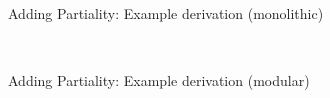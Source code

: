 \documentclass[main]{subfiles}
\begin{document}
\begin{frame}[fragile]{Adding Partiality: Example derivation (monolithic)}
\begin{code}
\\
%
\>[10]\AgdaSpace{}%
\AgdaSpace{}%
\AgdaSpace{}%
\AgdaSpace{}%
\AgdaSpace{}%
\AgdaSpace{}%
%
\>[27]\AgdaSpace{}%
\AgdaSpace{}%
\AgdaSpace{}%
\AgdaSpace{}%
\AgdaSpace{}%
\AgdaSpace{}%
\AgdaSpace{}%
%
\>[44]\<%
\end{code}
\end{frame}
\begin{frame}[fragile]{Adding Partiality: Example derivation (modular)}
\begin{code}%
\>[0]\AgdaFunction{\AgdaUnderscore{}}\AgdaSpace{}%
\AgdaSymbol{:}\AgdaSpace{}%
\AgdaSpace{}%
\AgdaSpace{}%
\AgdaSpace{}%
\AgdaSpace{}%
\AgdaSpace{}%
\AgdaSpace{}%
\AgdaSpace{}%
\AgdaSpace{}%
\AgdaSpace{}%
\AgdaSpace{}%
\AgdaSpace{}%
\AgdaSpace{}%
\AgdaSpace{}%
\AgdaSpace{}%
\AgdaSpace{}%
\AgdaSpace{}%
\AgdaSpace{}%
\AgdaSpace{}%
\AgdaSpace{}%
\AgdaSpace{}%
\AgdaSpace{}%
\AgdaSpace{}%
\AgdaSpace{}%
\AgdaSpace{}%
\AgdaSpace{}%
\AgdaSpace{}%
\AgdaSpace{}%
\AgdaSpace{}%
\AgdaSpace{}%
\AgdaSpace{}%
\AgdaSpace{}%
\AgdaSpace{}%
\AgdaSpace{}%
\AgdaSpace{}%
\<%
\\
\>[0]\AgdaSymbol{\AgdaUnderscore{}}%
\>[496I]\AgdaSymbol{=}\AgdaSpace{}%
%
\>[498I]\AgdaSpace{}%

\end{code}
\end{frame}
\end{document}

